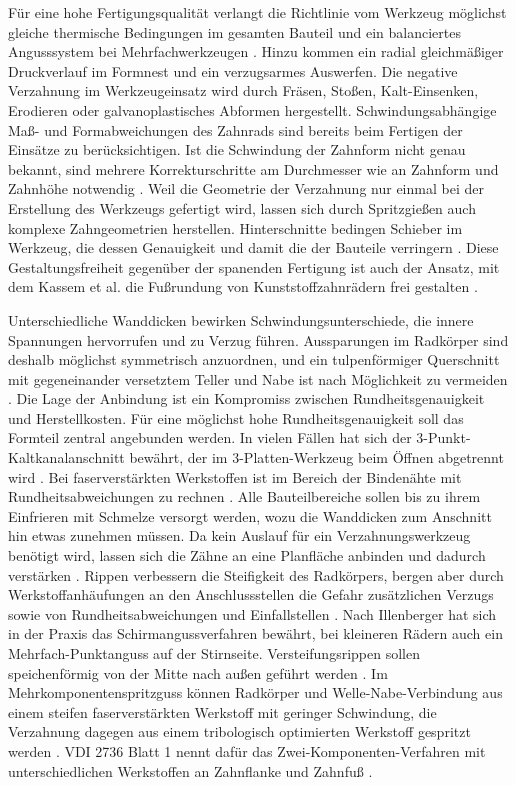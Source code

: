 Für eine hohe Fertigungsqualität verlangt die Richtlinie vom Werkzeug möglichst gleiche thermische Bedingungen im gesamten Bauteil und ein balanciertes Angusssystem bei Mehrfachwerkzeugen \cite[S.~27 f.]{VDI2736-1}. Hinzu kommen ein radial gleichmäßiger Druckverlauf im Formnest und ein verzugsarmes Auswerfen. Die negative Verzahnung im Werkzeugeinsatz wird durch Fräsen, Stoßen, Kalt-Einsenken, Erodieren oder galvanoplastisches Abformen hergestellt. Schwindungsabhängige Maß- und Formabweichungen des Zahnrads sind bereits beim Fertigen der Einsätze zu berücksichtigen. Ist die Schwindung der Zahnform nicht genau bekannt, sind mehrere Korrekturschritte am Durchmesser wie an Zahnform und Zahnhöhe notwendig \cite[S.~28]{VDI2736-1}. Weil die Geometrie der Verzahnung nur einmal bei der Erstellung des Werkzeugs gefertigt wird, lassen sich durch Spritzgießen auch komplexe Zahngeometrien herstellen. Hinterschnitte bedingen Schieber im Werkzeug, die dessen Genauigkeit und damit die der Bauteile verringern \cite[S.~28]{VDI2736-1}. Diese Gestaltungsfreiheit gegenüber der spanenden Fertigung ist auch der Ansatz, mit dem Kassem et al. die Fußrundung von Kunststoffzahnrädern frei gestalten \cite[S.~2]{Kas22}.

Unterschiedliche Wanddicken bewirken Schwindungsunterschiede, die innere Spannungen hervorrufen und zu Verzug führen. Aussparungen im Radkörper sind deshalb möglichst symmetrisch anzuordnen, und ein tulpenförmiger Querschnitt mit gegeneinander versetztem Teller und Nabe ist nach Möglichkeit zu vermeiden \cite[S.~37 f.]{VDI2736-1}. Die Lage der Anbindung ist ein Kompromiss zwischen Rundheitsgenauigkeit und Herstellkosten. Für eine möglichst hohe Rundheitsgenauigkeit soll das Formteil zentral angebunden werden. In vielen Fällen hat sich der 3-Punkt-Kaltkanalanschnitt bewährt, der im 3-Platten-Werkzeug beim Öffnen abgetrennt wird \cite[S.~38]{VDI2736-1}. Bei faserverstärkten Werkstoffen ist im Bereich der Bindenähte mit Rundheitsabweichungen zu rechnen \cite[S.~38]{VDI2736-1}. Alle Bauteilbereiche sollen bis zu ihrem Einfrieren mit Schmelze versorgt werden, wozu die Wanddicken zum Anschnitt hin etwas zunehmen müssen. Da kein Auslauf für ein Verzahnungswerkzeug benötigt wird, lassen sich die Zähne an eine Planfläche anbinden und dadurch verstärken \cite[S.~38]{VDI2736-1}. Rippen verbessern die Steifigkeit des Radkörpers, bergen aber durch Werkstoffanhäufungen an den Anschlussstellen die Gefahr zusätzlichen Verzugs sowie von Rundheitsabweichungen und Einfallstellen \cite[S.~39]{VDI2736-1}. Nach Illenberger hat sich in der Praxis das Schirmangussverfahren bewährt, bei kleineren Rädern auch ein Mehrfach-Punktanguss auf der Stirnseite. Versteifungsrippen sollen speichenförmig von der Mitte nach außen geführt werden \cite[S.~5 f.]{Ill22}. Im Mehrkomponentenspritzguss können Radkörper und Welle-Nabe-Verbindung aus einem steifen faserverstärkten Werkstoff mit geringer Schwindung, die Verzahnung dagegen aus einem tribologisch optimierten Werkstoff gespritzt werden \cite[S.~6]{Ill22}. VDI 2736 Blatt 1 nennt dafür das Zwei-Komponenten-Verfahren mit unterschiedlichen Werkstoffen an Zahnflanke und Zahnfuß \cite[S.~14]{VDI2736-1}.

